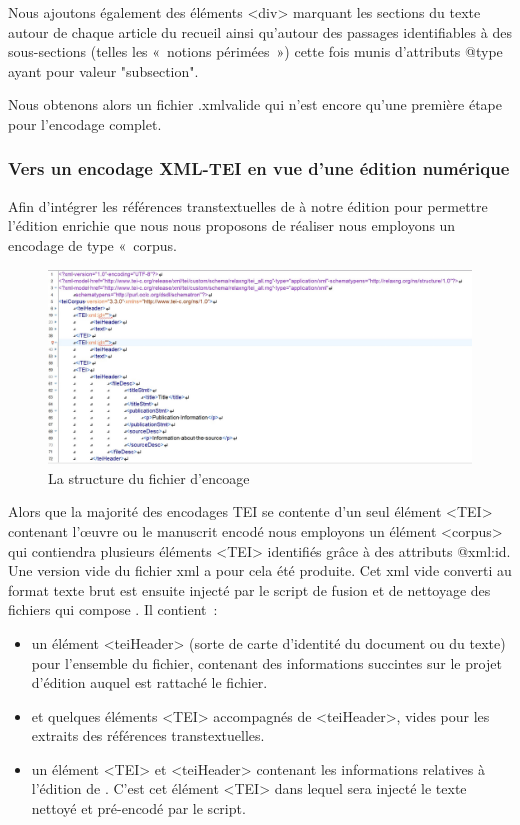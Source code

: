 \documentclass[12pt, a4paper]{article}
\begin{document}
Nous ajoutons également des éléments <div> marquant les sections du texte autour de chaque article du recueil ainsi qu'autour des passages identifiables à des sous-sections (telles les «~notions périmées~») cette fois munis d'attributs @type ayant pour valeur "subsection".

Nous obtenons alors un fichier \go.xml\gf valide qui n'est encore qu'une première étape pour l'encodage complet.

\subsubsection{Vers un encodage XML-TEI en vue d'une édition numérique}
\label{tei}

Afin d'intégrer les références transtextuelles de \punr{} à notre édition pour permettre l'édition enrichie que nous nous proposons de réaliser nous employons un encodage de type «~corpus\gf. 
\begin{figure}[H]
    \centering
    \includegraphics[scale=0.5]{img/screen_itei_corpus.jpg}
    \caption{La structure du fichier d'encoage}
    \label{fig:screen_tei_corpus}
\end{figure}
Alors que la majorité des encodages TEI se contente d'un seul élément <TEI> contenant l'œuvre ou le manuscrit encodé nous employons un élément <corpus> qui contiendra plusieurs éléments <TEI> identifiés grâce à des attributs @xml\NoAutoSpaceBeforeFDP:id. Une version vide du fichier xml a pour cela été produite. Cet xml vide converti au format texte brut est ensuite injecté par le script de fusion et de nettoyage des fichiers qui compose \punr. Il contient~:
\begin{itemize}
    \item un élément <teiHeader> (sorte de carte d'identité du document ou du texte) pour l'ensemble du fichier, contenant des informations succintes sur le projet d'édition auquel est rattaché le fichier.
    \item et quelques éléments <TEI> accompagnés de <teiHeader>, vides pour les extraits des références transtextuelles.
    \item un élément <TEI> et <teiHeader> contenant les informations relatives à l'édition de \punr. C'est cet élément <TEI> dans lequel sera injecté le texte nettoyé et pré-encodé par le script.
\end{itemize}
\end{document}
